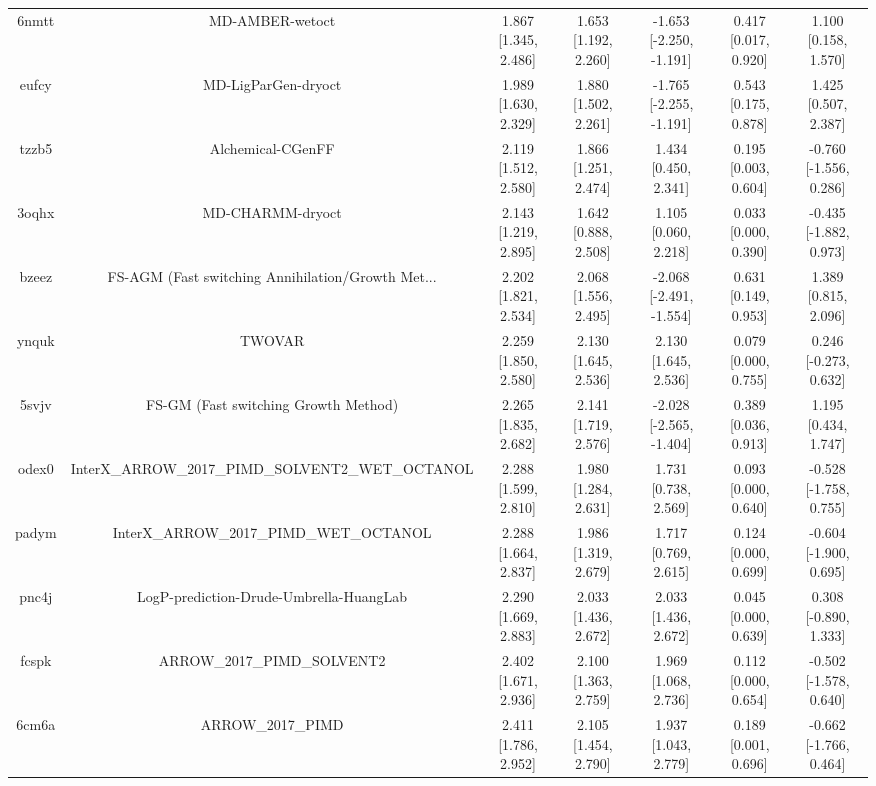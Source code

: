 \documentclass{article}
\begin{document}
\begin{center}
\begin{longtable}{|ccccccc|}
 6nmtt &                                    MD-AMBER-wetoct &  1.867 [1.345, 2.486] &  1.653 [1.192, 2.260] &  -1.653 [-2.250, -1.191] &  0.417 [0.017, 0.920] &    1.100 [0.158, 1.570] \\
 eufcy &                                MD-LigParGen-dryoct &  1.989 [1.630, 2.329] &  1.880 [1.502, 2.261] &  -1.765 [-2.255, -1.191] &  0.543 [0.175, 0.878] &    1.425 [0.507, 2.387] \\
 tzzb5 &                                  Alchemical-CGenFF &  2.119 [1.512, 2.580] &  1.866 [1.251, 2.474] &     1.434 [0.450, 2.341] &  0.195 [0.003, 0.604] &  -0.760 [-1.556, 0.286] \\
 3oqhx &                                   MD-CHARMM-dryoct &  2.143 [1.219, 2.895] &  1.642 [0.888, 2.508] &     1.105 [0.060, 2.218] &  0.033 [0.000, 0.390] &  -0.435 [-1.882, 0.973] \\
 bzeez &  FS-AGM (Fast switching Annihilation/Growth Met... &  2.202 [1.821, 2.534] &  2.068 [1.556, 2.495] &  -2.068 [-2.491, -1.554] &  0.631 [0.149, 0.953] &    1.389 [0.815, 2.096] \\
 ynquk &                                             TWOVAR &  2.259 [1.850, 2.580] &  2.130 [1.645, 2.536] &     2.130 [1.645, 2.536] &  0.079 [0.000, 0.755] &   0.246 [-0.273, 0.632] \\
 5svjv &               FS-GM (Fast switching Growth Method) &  2.265 [1.835, 2.682] &  2.141 [1.719, 2.576] &  -2.028 [-2.565, -1.404] &  0.389 [0.036, 0.913] &    1.195 [0.434, 1.747] \\
 odex0 &  InterX\_ARROW\_2017\_PIMD\_SOLVENT2\_WET\_OCTANOL &  2.288 [1.599, 2.810] &  1.980 [1.284, 2.631] &     1.731 [0.738, 2.569] &  0.093 [0.000, 0.640] &  -0.528 [-1.758, 0.755] \\
 padym &            InterX\_ARROW\_2017\_PIMD\_WET\_OCTANOL &  2.288 [1.664, 2.837] &  1.986 [1.319, 2.679] &     1.717 [0.769, 2.615] &  0.124 [0.000, 0.699] &  -0.604 [-1.900, 0.695] \\
 pnc4j &            LogP-prediction-Drude-Umbrella-HuangLab &  2.290 [1.669, 2.883] &  2.033 [1.436, 2.672] &     2.033 [1.436, 2.672] &  0.045 [0.000, 0.639] &   0.308 [-0.890, 1.333] \\
 fcspk &                        ARROW\_2017\_PIMD\_SOLVENT2 &  2.402 [1.671, 2.936] &  2.100 [1.363, 2.759] &     1.969 [1.068, 2.736] &  0.112 [0.000, 0.654] &  -0.502 [-1.578, 0.640] \\
 6cm6a &                                  ARROW\_2017\_PIMD &  2.411 [1.786, 2.952] &  2.105 [1.454, 2.790] &     1.937 [1.043, 2.779] &  0.189 [0.001, 0.696] &  -0.662 [-1.766, 0.464] \\

\end{longtable}
\end{center}
\end{document}
